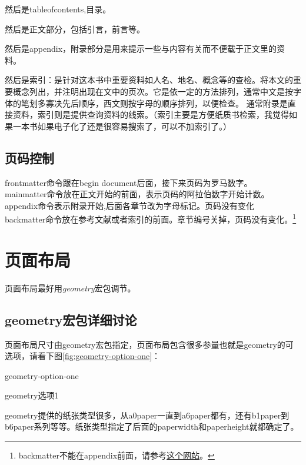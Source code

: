 \documentclass[11pt,oneside]{book}
\begin{document}
  然后是tableofcontents,目录。

  然后是正文部分，包括引言，前言等。

  然后是appendix，附录部分是用来提示一些与内容有关而不便载于正文里的资料。

  然后是索引：是针对这本书中重要资料如人名、地名、概念等的查检。将本文的重要概念列出，并注明出现在文中的页次。它是依一定的方法排列，通常中文是按字体的笔划多寡决先后顺序，西文则按字母的顺序排列，以便检查。 通常附录是直接资料，索引则是提供查询资料的线索。（索引主要是方便纸质书检索，我觉得如果一本书如果电子化了还是很容易搜索了，可以不加索引了。）


  \section{页码控制}
  \label{sec:页码}
  frontmatter命令跟在begin document后面，接下来页码为罗马数字。\\
  mainmatter命令放在正文开始的前面，表示页码的阿拉伯数字开始计数。\\
  appendix命令表示附录开始,后面各章节改为字母标记。页码没有变化\\
  backmatter命令放在参考文献或者索引的前面。章节编号关掉，页码没有变化。\footnote{backmatter不能在appendix前面，请参考\href{http://tex.stackexchange.com/questions/20538/what-is-the-right-order-when-using-frontmatter-tableofcontents-mainmatter}{这个网站}。}



  \chapter{页面布局}
  页面布局最好用\emph{geometry}宏包调节。

  \section{geometry宏包详细讨论}
  页面布局尺寸由geometry宏包指定，页面布局包含很多参量也就是geometry的可选项，请看下图\ref{fig:geometry-option-one}：

  \begin{linefig}{geometry-option-one}   %
    \caption{geometry选项1}
    \label{fig:geometry-option-one}
  \end{linefig}

  geometry提供的纸张类型很多，从a0paper一直到a6paper都有，还有b1paper到b6paper系列等等。纸张类型指定了后面的paperwidth和paperheight就都确定了。
\end{document}

